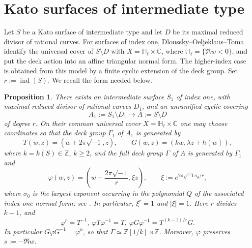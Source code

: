 \documentclass[12pt]{amsart}
\numberwithin{equation}{section}
\newtheorem{propo}{Proposition}
\theoremstyle{remark}
\theoremstyle{definition}
\begin{document}
\section{Kato surfaces of intermediate type}

Let $S$ be a Kato surface of intermediate type and let $D$ be its maximal reduced divisor of rational curves. For surfaces of index one, Dloussky--Oeljeklaus--Toma \cite{dloussky-oeljeklaus-toma} identify the universal cover of $S\setminus D$ with $X=\mathbb H_\ell\times\mathbb C$, where $\mathbb H_\ell=\{\Re w<0\}$, and put the deck action into an affine triangular normal form. The higher-index case is obtained from this model by a finite cyclic extension of the deck group. Set $r:=\operatorname{ind}(S)$. We recall the form needed below.

 

 \begin{propo}\label{prop:higher-index-green-model}
There exists an intermediate surface $S_1$ of index one, with maximal reduced divisor of rational curves $D_1$, and an unramified cyclic covering
$$
A_1:=S_1\setminus D_1\longrightarrow A:=S\setminus D
$$
of degree $r$. On their common universal cover $X=\mathbb H_\ell\times\mathbb C$ one may choose coordinates so that the deck group $\Gamma_1$ of $A_1$ is generated by
$$
T(w,z)=(w+2\pi\sqrt{-1},z),\qquad
G(w,z)=(kw,\lambda z+h(w)),
$$
where $k=k(S)\in\mathbb Z$, $k\geq2$, and the full deck group $\Gamma$ of $A$ is generated by $\Gamma_1$ and
$$
\varphi(w,z)=\left(w-\frac{2\pi\sqrt{-1}}{r},\xi z\right),
\qquad
\xi:=e^{2\pi\sqrt{-1}\sigma_0/r},
$$
where $\sigma_0$ is the largest exponent occurring in the polynomial $Q$ of the associated index-one normal form; see \cite[Sections~3.1--3.2]{oeljeklaus-toma-moduli}. In particular, $\xi^r=1$ and $|\xi|=1$.
Here $r$ divides $k-1$, and
$$
\varphi^r=T^{-1},\ 
\varphi T\varphi^{-1}=T,\ 
\varphi G\varphi^{-1}=T^{(k-1)/r}G.
$$
In particular $G\varphi G^{-1}=\varphi^k$, so that
$\Gamma\simeq\mathbb Z[1/k]\rtimes\mathbb Z$. Moreover, $\varphi$ preserves
$s:=-\Re w$.
\end{propo}
\end{document}

